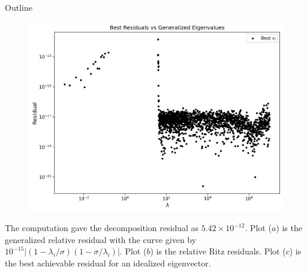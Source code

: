 \documentclass[landscape]{beamer}
\begin{document}
\begin{frame}[allowframebreaks]{Outline}
\begin{figure}
	\vspace{2ex}  %
	
	\centering
	\includegraphics[scale=.25]{./Plots/LU/residual_lu_bl.png}
	\subcaption{}
\end{figure}

  The computation gave the decomposition residual as $5.42 \times 10^{-12}$. Plot ($a$) is the generalized relative residual with the curve given by
 $10^{-15}|(1-\lambda_i/\sigma)(1-\sigma/\lambda_i)|$. Plot ($b$) is the relative Ritz residuals. Plot ($c$) is the best achievable residual for an idealized eigenvector.
\end{frame}
\end{document}
